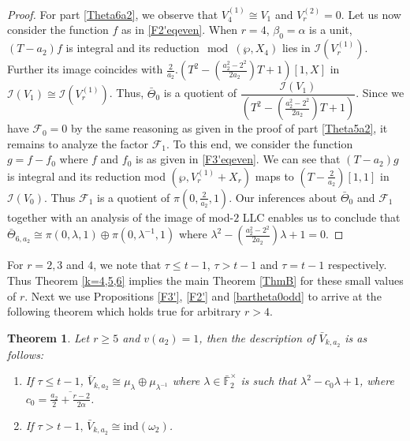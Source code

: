 \documentclass[11pt, reqno]{amsart}
\numberwithin{equation}{section}
\newcommand\ind{\mathrm{ind}}
\newcommand\sF{{\mathcal{F}}}
\newcommand{\F}{\mathbb{F}}
\newtheorem{theorem}[thm]{Theorem}
\theoremstyle{definition}
\theoremstyle{remark}
\theoremstyle{definition}
\theoremstyle{remark}
\theoremstyle{remark}
\begin{document}
\begin{proof}
For part \eqref{Theta6a2}, we observe that  $V_{4}^{(1)} \cong V_{1}$ and $V_{r}^{(2)}=0$. Let us now consider the function $f$ as in \eqref{F2'eqeven}. When $r=4$, $\beta_{0}=\alpha$ is a unit, $(T-a_{2})f$ is integral and its reduction$\mod (\wp,X_{4})$ lies in $\mathcal{I}(V_{r}^{(1)})$. Further its image coincides with $\frac{2}{a_{2}}.\left(T^2-\left(\frac{a_{2}^2-2^2}{2a_{2}}\right)T+1 \right)[1,X]$ in $  \mathcal{I}(V_{1})\cong \mathcal{I}(V_{r}^{(1)})$. Thus, $\bar{\Theta}_{0}$ is a quotient of $\dfrac{\mathcal{I}(V_{1})}{\left(T^2-\left(\frac{a_{2}^2-2^2}{2a_{2}}\right)T+1 \right)}$. Since we have $\sF_{0}=0$ by the same reasoning as given in the proof of part \eqref{Theta5a2}, it remains to analyze the factor $\sF_{1}$. To this end, we consider the function $g=f-f_{0}$ where $f$ and $f_{0}$ is as given in \eqref{F3'eqeven}. We can see that $(T-a_{2})g$ is integral and its reduction mod $(\wp,V_{r}^{(1)}+X_{r})$ maps to $\left(T-\frac{2}{a_{2}}\right)[1,1]$ in $\mathcal{I}(V_{0}).$ Thus $\sF_{1}$ is a quotient of $\pi(0,\frac{2}{a_{2}},1).$ Our inferences about $\bar{\Theta}_{0}$ and $\sF_{1}$ together with an analysis of the image of mod-$2$ LLC enables us to conclude that $\bar{\Theta}_{6,a_{2}} \cong\pi(0,\lambda,1)\oplus \pi(0,\lambda^{-1},1)$ where $\lambda^2- \left(\frac{a_{2}^2-2^2}{2a_{2}}\right)\lambda+1=0.$
\end{proof}
For $r=2,3$ and $4$, we note that $\tau \leq t-1$, $\tau>t-1$ and $\tau=t-1$ respectively. Thus Theorem \ref{k=4,5,6} implies the main Theorem \ref{ThmB} for these small values of $r$. Next we use Propositions \ref{F3'}, \ref{F2'} and \ref{bartheta0odd} to arrive at the following theorem which holds true for arbitrary $r>4$.
\begin{theorem}\label{mtslope1p=2}
    Let $r\geq 5$ and $v(a_{2})=1$, then the description of $\bar{V}_{k,a_{2}}$ is as follows:
    \begin{enumerate}
        \item If $\tau\leq t-1$, $\bar{V}_{k,a_{2}} \cong \mu_{\lambda}\oplus \mu_{\lambda^{-1}}$ where $\lambda \in \bar{\F}_{2}^{\times}$ is such that $\lambda^2-c_{0}\lambda + 1$, where $c_{0}= \overline{\frac{a_{2}}{2} + \frac{r-2}{2\alpha}}$. 
        \item If $\tau>t-1, \,\bar{V}_{k,a_{2}} \cong \ind(\omega_{2})$.
    \end{enumerate}
\end{theorem}
\end{document}
